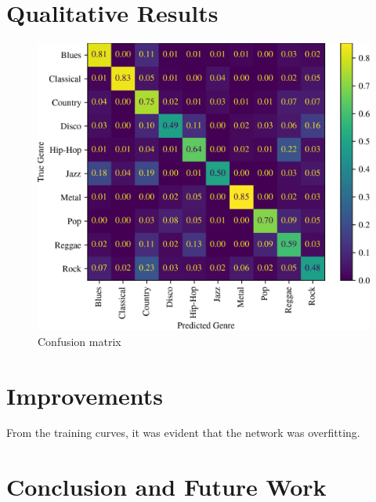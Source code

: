 \documentclass[conference]{IEEEtran}
\begin{document}
\section{Qualitative Results}

\begin{figure}[htbp]
    \centerline{\includegraphics[width=\columnwidth]{cm.png}}
    \caption{Confusion matrix}
    \label{loss_curves}
\end{figure}

\section{Improvements}

From the training curves, it was evident that the network was overfitting.

\section{Conclusion and Future Work}





\end{document}
